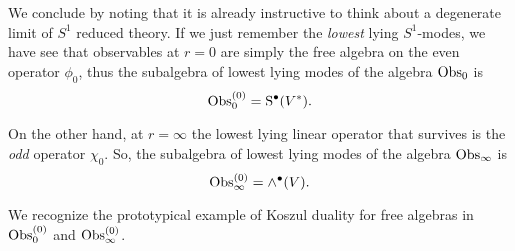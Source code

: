 \documentclass[11pt]{amsart}
\def\brian#1{{\textcolor{blue!65!red}{BRW: {#1}}}}
\begin{document}
We conclude by noting that it is already instructive to think about a degenerate limit of $S^1$ reduced theory. 
If we just remember the {\em lowest} lying $S^1$-modes, we have see that observables at $r=0$ are simply the free algebra on the even operator $\phi_0$, thus the subalgebra of lowest lying modes of the algebra ${\rm Obs}_0$ is
\[
{\rm Obs}_0^{(0)} = {\rm S}^\bullet(V^*).
\]

On the other hand, at $r=\infty$ the lowest lying linear operator that survives is the {\em odd} operator $\chi_0$.
So, the subalgebra of lowest lying modes of the algebra ${\rm Obs}_\infty$ is
\[
{\rm Obs}_\infty^{(0)} = \wedge^\bullet(V) .
\]

We recognize the prototypical example of Koszul duality for free algebras in ${\rm Obs}_0^{(0)}$ and ${\rm Obs}_\infty^{(0)}$. 


%
%
%
%
%
\end{document}
